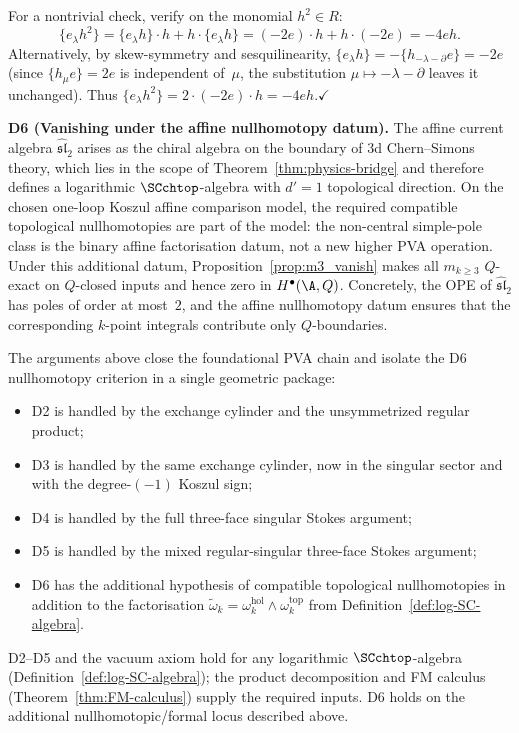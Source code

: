 \begin{example}
For a nontrivial check, verify on the monomial $h^2\in R$:
\[
\{e_\lambda h^2\}
=
\{e_\lambda h\}\cdot h + h\cdot\{e_\lambda h\}
=
(-2e)\cdot h + h\cdot(-2e)
=
-4eh.
\]
Alternatively, by skew-symmetry and sesquilinearity,
$\{e_\lambda h\}=-\{h_{-\lambda-\partial}e\}=-2e$ (since $\{h_\mu e\}=2e$
is independent of~$\mu$, the substitution $\mu\mapsto-\lambda-\partial$
leaves it unchanged).
Thus $\{e_\lambda h^2\}=2\cdot(-2e)\cdot h = -4eh$.\quad$\checkmark$

\smallskip
\noindent\textbf{D6 (Vanishing under the affine nullhomotopy datum).}
The affine current algebra $\widehat{\mathfrak{sl}}_2$ arises as the
chiral algebra on the boundary of $3$d Chern--Simons theory, which
lies in the scope of Theorem~\ref{thm:physics-bridge} and therefore defines
a logarithmic $\SCchtop$-algebra with $d'=1$ topological direction.
On the chosen one-loop Koszul affine comparison model, the required
compatible topological nullhomotopies are part of the model: the
non-central simple-pole class is the binary affine factorisation
datum, not a new higher PVA operation. Under this additional datum,
Proposition~\ref{prop:m3_vanish} makes all $m_{k\ge3}$ $Q$-exact on
$Q$-closed inputs and hence zero in $H^\bullet(\A,Q)$. Concretely, the OPE of
$\widehat{\mathfrak{sl}}_2$ has poles of order at most~$2$, and the
affine nullhomotopy datum ensures that the corresponding $k$-point
integrals contribute only $Q$-boundaries.
\end{example}

\begin{remark}
The arguments above close the foundational PVA chain and isolate the
D6 nullhomotopy criterion in a single geometric package:
\begin{itemize}
\item D2 is handled by the exchange cylinder and the unsymmetrized regular product;
\item D3 is handled by the same exchange cylinder, now in the singular sector and with
 the degree-$(-1)$ Koszul sign;
\item D4 is handled by the full three-face singular Stokes argument;
\item D5 is handled by the mixed regular-singular three-face Stokes argument;
\item D6 has the additional hypothesis of compatible topological
 nullhomotopies in addition to the factorisation
 $\widetilde\omega_k=\omega_k^{\mathrm{hol}}\wedge\omega_k^{\mathrm{top}}$
 from Definition~\ref{def:log-SC-algebra}.
\end{itemize}
D2--D5 and the vacuum axiom hold for any logarithmic
$\SCchtop$-algebra (Definition~\ref{def:log-SC-algebra}); the product
decomposition and FM calculus (Theorem~\ref{thm:FM-calculus}) supply
the required inputs. D6 holds on the additional nullhomotopic/formal
locus described above.
\end{remark}

